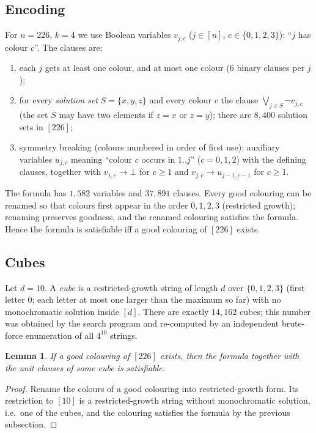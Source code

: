 \documentclass[11pt,a4paper]{article}
\newtheorem{lemma}{Lemma}
\theoremstyle{remark}
\begin{document}
\subsection{Encoding}
For $n=226$, $k=4$ we use Boolean variables $v_{j,c}$ ($j\in[n]$, $c\in\{0,1,2,3\}$): ``$j$ has colour $c$''.
The clauses are:
\begin{enumerate}
\item each $j$ gets at least one colour, and at most one colour (6 binary clauses per $j$);
\item for every \emph{solution set} $S=\{x,y,z\}$ and every colour $c$ the clause $\bigvee_{j\in S}\neg v_{j,c}$
 (the set $S$ may have two elements if $z=x$ or $z=y$); there are $8{,}400$ solution sets in $[226]$;
\item symmetry breaking (colours numbered in order of first use): auxiliary variables $u_{j,c}$ meaning ``colour $c$ occurs in $1..j$''
 ($c=0,1,2$) with the defining clauses, together with $v_{1,c}\to\bot$ for $c\ge1$ and $v_{j,c}\to u_{j-1,c-1}$ for $c\ge 1$.
\end{enumerate}
The formula has $1{,}582$ variables and $37{,}891$ clauses.
Every good colouring can be renamed so that colours first appear in the order $0,1,2,3$ (restricted growth); renaming preserves goodness,
and the renamed colouring satisfies the formula. Hence the formula is satisfiable iff a good colouring of $[226]$ exists.

\subsection{Cubes}
Let $d=10$. A \emph{cube} is a restricted-growth string of length $d$ over $\{0,1,2,3\}$ (first letter $0$; each letter at most one larger than the maximum so far) with no
monochromatic solution inside $[d]$. There are exactly $14{,}162$ cubes; this number was obtained by the search program
and re-computed by an independent brute-force enumeration of all $4^{10}$ strings.

\begin{lemma}\label{lem:cover}
If a good colouring of $[226]$ exists, then the formula together with the unit clauses of some cube is satisfiable.
\end{lemma}
\begin{proof}
Rename the colours of a good colouring into restricted-growth form. Its restriction to $[10]$ is a restricted-growth string
without monochromatic solution, i.e.\ one of the cubes, and the colouring satisfies the formula by the previous subsection.
\end{proof}
\end{document}
